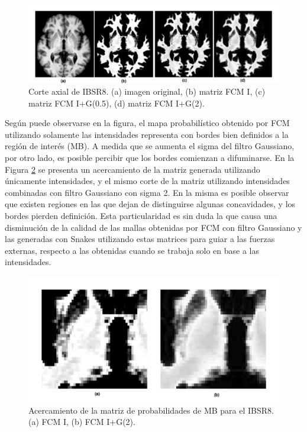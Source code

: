 \begin{figure}[H]
	\centering
	\includegraphics[scale=0.08]{images/IBSR_vs_probx3-001.jpg}
	\caption{Corte axial de IBSR8. (a) imagen original, (b) matriz FCM I, (c) matriz FCM I+G(0.5), (d) matriz FCM I+G(2).}
	\label{fig:cualitativa_matrices}
\end{figure}

Según puede observarse en la figura, el mapa probabilístico obtenido por FCM utilizando solamente las intensidades representa con bordes bien definidos a la región de interés (MB). A medida que se aumenta el sigma del filtro Gaussiano, por otro lado, es posible percibir que los bordes comienzan a difuminarse. En la Figura \ref{fig:cualitativa_acercamiento} se presenta un acercamiento de la matriz generada utilizando únicamente intensidades, y el mismo corte de la matriz utilizando intensidades combinadas con filtro Gaussiano con sigma 2. En la misma es posible observar que existen regiones en las que dejan de distinguirse algunas concavidades, y los bordes pierden definición. Esta particularidad es sin duda la que causa una disminución de la calidad de las mallas obtenidas por FCM con filtro Gaussiano y las generadas con Snakes utilizando estas matrices para guiar a las fuerzas externas, respecto a las obtenidas cuando se trabaja solo en base a las intensidades.

\begin{figure}[H]
	\centering
	\includegraphics[scale=0.08]{images/acercamiento_prob_NF_vs_prob_GA2.jpg}
	\caption{Acercamiento de la matriz de probabilidades de MB para el IBSR8. (a) FCM I, (b) FCM  I+G(2).}
	\label{fig:cualitativa_acercamiento}
\end{figure}

